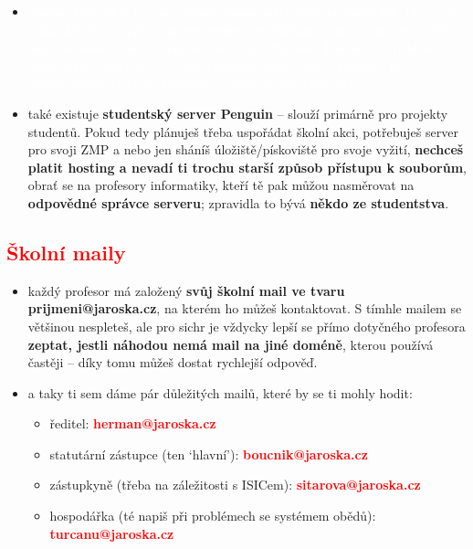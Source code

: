 \documentclass{article}
\newcommand{\podnadpis}[1]{
  \subsection*{\textcolor{red}{#1}}
}
\begin{document}
\begin{redbox}
  \begin{itemize}[leftmargin=10pt]
    \item[\textcolor{white}{\textbullet}] \textcolor{white}{trochu složitější je to pak s připojováním notebooků na školní wifi: jde to, ale těžko. Ideální je zajít za panem profesorem Blahou (jehož kabinet si můžeš najít na plánku školy) a poprosit ho o zpřístupnění. Trochu se ti pohrabe v notebooku a zařídí ti, že se bez problémů budeš moct připojit a psát si zápisky online třeba na OneNote. -- nelíbí se mi tento text}
  \end{itemize}
\end{redbox}
\begin{itemize}[leftmargin=10pt]
  \item  také existuje \textbf{studentský server Penguin} -- slouží primárně pro projekty studentů. Pokud tedy plánuješ třeba uspořádat školní akci, potřebuješ server pro svoji ZMP a nebo jen sháníš úložiště/pískoviště pro svoje vyžití, \textbf{nechceš platit hosting a nevadí ti trochu starší způsob přístupu k souborům}, obrať se na profesory informatiky, kteří tě pak můžou nasměrovat na \textbf{odpovědné správce serveru}; zpravidla to bývá \textbf{někdo ze studentstva}.
\end{itemize}

\podnadpis{Školní maily}
\begin{itemize}[leftmargin=10pt]
  \item každý profesor má založený \textbf{svůj školní mail ve tvaru prijmeni@jaroska.cz}, na kterém ho můžeš kontaktovat. S tímhle mailem se většinou nespleteš, ale pro sichr je vždycky lepší se přímo dotyčného profesora \textbf{zeptat, jestli náhodou nemá mail na jiné doméně}, kterou používá častěji -- díky tomu můžeš dostat rychlejší odpověď.
  \item  a taky ti sem dáme pár důležitých mailů, které by se ti mohly hodit:
  \begin{itemize}[leftmargin=0pt]
    \item  ředitel: \textcolor{red}{\textbf{herman@jaroska.cz}}
    \item statutární zástupce (ten ‘hlavní’): \textcolor{red}{\textbf{boucnik@jaroska.cz}}
    \item zástupkyně (třeba na záležitosti s ISICem): \textcolor{red}{\textbf{sitarova@jaroska.cz}}
    \item  hospodářka (té napiš při problémech se systémem obědů): \textcolor{red}{\textbf{turcanu@jaroska.cz}}
  \end{itemize}
\end{itemize}
\end{document}

